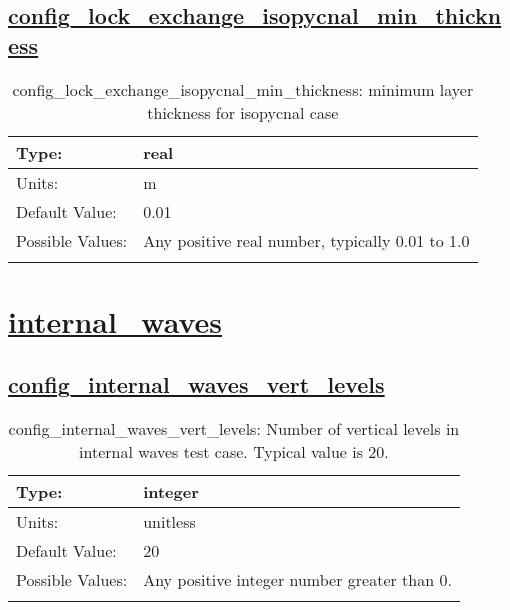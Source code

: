 \subsection[config\_lock\_exchange\_isopycnal\_min\_thickness]{\hyperref[sec:nm_tab_lock_exchange]{config\_lock\_exchange\_isopycnal\_min\_thickness}}
\label{subsec:nm_sec_config_lock_exchange_isopycnal_min_thickness}
\begin{center}
\begin{longtable}{| p{2.0in} || p{4.0in} |}
    \hline
    Type: & real \\
    \hline
    Units: & \si{m} \\
    \hline
    Default Value: & 0.01 \\
    \hline
    Possible Values: & Any positive real number, typically 0.01 to 1.0 \\
    \hline
    \caption{config\_lock\_exchange\_isopycnal\_min\_thickness: minimum layer thickness for isopycnal case}
\end{longtable}
\end{center}
\section[internal\_waves]{\hyperref[sec:nm_tab_internal_waves]{internal\_waves}}
\label{sec:nm_sec_internal_waves}
\subsection[config\_internal\_waves\_vert\_levels]{\hyperref[sec:nm_tab_internal_waves]{config\_internal\_waves\_vert\_levels}}
\label{subsec:nm_sec_config_internal_waves_vert_levels}
\begin{center}
\begin{longtable}{| p{2.0in} || p{4.0in} |}
    \hline
    Type: & integer \\
    \hline
    Units: & \si{unitless} \\
    \hline
    Default Value: & 20 \\
    \hline
    Possible Values: & Any positive integer number greater than 0. \\
    \hline
    \caption{config\_internal\_waves\_vert\_levels: Number of vertical levels in internal waves test case. Typical value is 20.}
\end{longtable}
\end{center}
